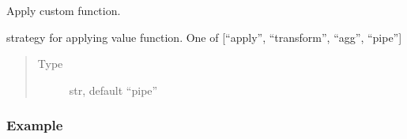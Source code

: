 \documentclass[letterpaper,10pt,english]{sphinxmanual}
\begin{document}
\begin{fulllineitems}
\label{\detokenize{beginners-guide:dalio.pipe.col_generation.Custom}}
Apply custom function.

\begin{fulllineitems}
\label{\detokenize{beginners-guide:dalio.pipe.col_generation.Custom.strategy}}
strategy for applying value function.
One of {[}“apply”, “transform”, “agg”, “pipe”{]}
\begin{quote}\begin{description}
\item[{Type}] \leavevmode
str, default “pipe”

\end{description}\end{quote}

\end{fulllineitems}

\subsubsection*{Example}


\end{fulllineitems}
\end{document}
